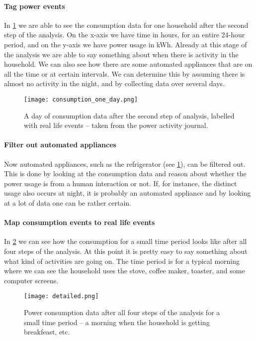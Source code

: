 \paragraph{Tag power events}
In \cref{consumption_one_day} we are able to see the consumption data for one household after the second step of the analysis.
On the x-axis we have time in hours, for an entire 24-hour period, and on the y-axis we have power usage in kWh.
Already at this stage of the analysis we are able to say something about when there is activity in the household.
We can also see how there are some automated appliances that are on all the time or at certain intervals.
We can determine this by assuming there is almost no activity in the night, and by collecting data over several days.

\begin{figure}
  \begin{center}
    \texttt{[image: consumption\_one\_day.png]}
  \end{center}
  \caption{A day of consumption data after the second step of analysis, labelled with real life events -- taken from the power activity journal.}
  \label{consumption_one_day}
\end{figure}

\paragraph{Filter out automated appliances}
Now automated appliances, such as the refrigerator (see \cref{consumption_one_day}), can be filtered out.
This is done by looking at the consumption data and reason about whether the power usage is from a human interaction or not.
If, for instance, the distinct usage also occurs at night, it is probably an automated appliance and by looking at a lot of data one can be rather certain.

\paragraph{Map consumption events to real life events}
In \cref{detailed_consumption} we can see how the consumption for a small time period looks like after all four steps of the analysis.
At this point it is pretty easy to say something about what kind of activities are going on.
The time period is for a typical morning where we can see the household uses the stove, coffee maker, toaster, and some computer screens.

\begin{figure}
  \begin{center}
    \texttt{[image: detailed.png]}
  \end{center}
  \caption{Power consumption data after all four steps of the analysis for a small time period -- a morning when the household is getting breakfeast, etc.}
  \label{detailed_consumption}
\end{figure}

